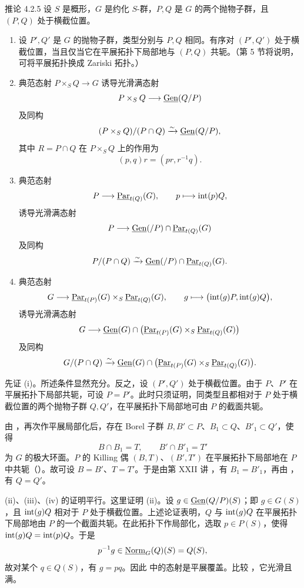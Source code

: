 \begin{sgastatement}{推论 4.2.5}
设 \(S\) 是概形，\(G\) 是约化 \(S\)-群，\(P,Q\) 是 \(G\) 的两个抛物子群，且 \((P,Q)\) 处于横截位置。
\begin{enumerate}[label=\textup{(\roman*)}]
\item 设 \(P',Q'\) 是 \(G\) 的抛物子群，类型分别与 \(P,Q\) 相同。有序对 \((P',Q')\) 处于横截位置，当且仅当它在平展拓扑下局部地与 \((P,Q)\) 共轭。（第 5 节将说明，可将平展拓扑换成 Zariski 拓扑。）
\item 典范态射 \(P\times_SQ\to G\) 诱导光滑满态射
\[
 P\times_SQ\longrightarrow\underline{\operatorname{Gen}}(Q/P)
\]
及同构
\[
 (P\times_SQ)/(P\cap Q)\xrightarrow{\sim}\underline{\operatorname{Gen}}(Q/P),
\]
其中 \(R=P\cap Q\) 在 \(P\times_SQ\) 上的作用为
\[
 (p,q)r=(pr,r^{-1}q).
\]
\item 典范态射
\[
 P\longrightarrow\underline{\operatorname{Par}}_{t(Q)}(G),\qquad p\longmapsto\operatorname{int}(p)Q,
\]
诱导光滑满态射
\[
 P\longrightarrow\underline{\operatorname{Gen}}(/P)\cap\underline{\operatorname{Par}}_{t(Q)}(G)
\]
及同构
\[
 P/(P\cap Q)\xrightarrow{\sim}
 \underline{\operatorname{Gen}}(/P)\cap\underline{\operatorname{Par}}_{t(Q)}(G).
\]
\item 典范态射
\[
 G\longrightarrow\underline{\operatorname{Par}}_{t(P)}(G)\times_S\underline{\operatorname{Par}}_{t(Q)}(G),\qquad
 g\longmapsto\bigl(\operatorname{int}(g)P,\operatorname{int}(g)Q\bigr),
\]
诱导光滑满态射
\[
 G\longrightarrow
 \underline{\operatorname{Gen}}(G)\cap
 \bigl(\underline{\operatorname{Par}}_{t(P)}(G)\times_S\underline{\operatorname{Par}}_{t(Q)}(G)\bigr)
\]
及同构
\[
 G/(P\cap Q)\xrightarrow{\sim}
 \underline{\operatorname{Gen}}(G)\cap
 \bigl(\underline{\operatorname{Par}}_{t(P)}(G)\times_S\underline{\operatorname{Par}}_{t(Q)}(G)\bigr).
\]
\end{enumerate}
\end{sgastatement}

\SGAProof
先证 (i)。所述条件显然充分。反之，设 \((P',Q')\) 处于横截位置。由于 \(P\)、\(P'\) 在平展拓扑下局部共轭，可设 \(P=P'\)。此时只须证明，同类型且都相对于 \(P\) 处于横截位置的两个抛物子群 \(Q,Q'\)，在平展拓扑下局部地可由 \(P\) 的截面共轭。

由 \textup{}，再次作平展局部化后，存在 Borel 子群 \(B,B'\subset P\)、\(B_1\subset Q\)、\(B'_1\subset Q'\)，使得
\[
 B\cap B_1=T,\qquad B'\cap B'_1=T'
\]
为 \(G\) 的极大环面。\(P\) 的 Killing 偶 \((B,T)\)、\((B',T')\) 在平展拓扑下局部地在 \(P\) 中共轭（）。故可设 \(B=B'\)、\(T=T'\)。于是由第 XXII 讲 ，有 \(B_1=B'_1\)，再由 ，有 \(Q=Q'\)。

(ii)、(iii)、(iv) 的证明平行。这里证明 (ii)。设 \(g\in\underline{\operatorname{Gen}}(Q/P)(S)\)；即 \(g\in G(S)\)，且 \(\operatorname{int}(g)Q\) 相对于 \(P\) 处于横截位置。上述论证表明，\(Q\) 与 \(\operatorname{int}(g)Q\) 在平展拓扑下局部地由 \(P\) 的一个截面共轭。在此拓扑下作局部化，选取 \(p\in P(S)\)，使得 \(\operatorname{int}(g)Q=\operatorname{int}(p)Q\)。于是
\[
 p^{-1}g\in\underline{\operatorname{Norm}}_G(Q)(S)=Q(S),
\]
故对某个 \(q\in Q(S)\)，有 \(g=pq\)。因此 \textup{} 中的态射是平展覆盖。比较 \textup{}，它光滑且满。

